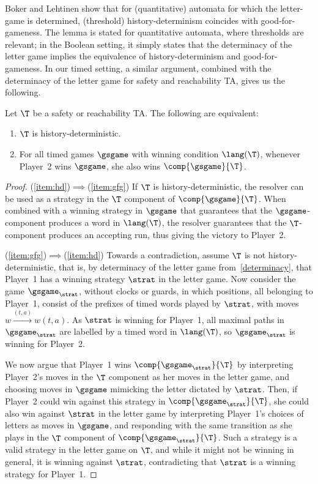 \medskip
Boker and Lehtinen \cite[Lemma 7]{BL21} show that for (quantitative) automata for which the letter-game is determined, (threshold) history-determinism coincides with good-for-gameness. The lemma is stated for quantitative automata, where thresholds are relevant; in the Boolean setting, it simply states that the determinacy of the letter game implies the equivalence of history-determinism and good-for-gameness. In our timed setting, a similar argument, combined with the determinacy of the letter game for safety and reachability TA, gives us the following.

\begin{theorem}\label{lem:gfg2hd}
	Let $\T$ be a safety or reachability TA. The following are equivalent: %
	\begin{enumerate}
		\item\label{item:hd} $\T$ is history-deterministic.
		\item\label{item:gfg} For all timed games $\gsgame$ with winning condition $\lang(\T)$, whenever  Player~2 wins $\gsgame$, she also wins $\comp{\gsgame}{\T}$.
	\end{enumerate} 

\end{theorem}

\begin{proof}
	(\ref{item:hd})$\implies$(\ref{item:gfg}) If $\T$ is history-deterministic, the resolver can be used as a strategy in the $\T$ component of $\comp{\gsgame}{\T}$. When combined with a winning strategy in $\gsgame$ that guarantees that the $\gsgame$-component produces a word in $\lang(\T)$, the resolver guarantees that the $\T$-component produces an accepting run, thus giving the victory to Player~2.
	
	(\ref{item:gfg})$\implies$(\ref{item:hd}) Towards a contradiction, assume $\T$ is not history-deterministic, that is, by determinacy of the letter game from~\cref{determinacy}, that Player~1 has a winning strategy $\strat$ in the letter game.
	Now consider the game $\gsgame_\strat$, without clocks or guards, in which positions, all belonging to Player~1, consist of the prefixes of timed words played by $\strat$, with moves $w\xrightarrow{(t,a)} w(t,a)$. %
	As $\strat$ is winning for Player~1, all maximal paths in $\gsgame_\strat$ are labelled by a timed word in $\lang(\T)$, so $\gsgame_\strat$ is winning for Player~2.
	
	We now argue that Player~1 wins $\comp{\gsgame_\strat}{\T}$ by interpreting Player~2's moves in the $\T$ component as her moves in the letter game, and choosing moves in $\gsgame$ mimicking the letter dictated by $\strat$. Then, if Player~2 could win against this strategy in $\comp{\gsgame_\strat}{\T}$, she could also win against $\strat$ in the letter game by interpreting Player~1's choices of letters as moves in $\gsgame$, and responding with the same transition as she plays in the $\T$ component of $\comp{\gsgame_\strat}{\T}$. Such a strategy is a valid strategy in the letter game on $\T$, and while it might not be winning in general, it is winning against $\strat$, contradicting that $\strat$ is a winning strategy for Player~1.
\end{proof}

